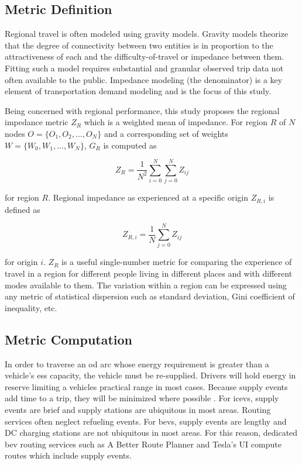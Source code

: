 \subsection*{Metric Definition}

Regional travel is often modeled using gravity models. Gravity models theorize that the degree of connectivity between two entities is in proportion to the attractiveness of each and the difficulty-of-travel or impedance between them. Fitting such a model requires substantial and granular observed trip data not often available to the public. Impedance modeling (the denominator) is a key element of transportation demand modeling and is the focus of this study.

Being concerned with regional performance, this study proposes the regional impedance metric $Z_R$ which is a weighted mean of impedance. For region $R$ of $N$ nodes $O = \{O_1, O_2, \dots, O_N\}$ and a corresponding set of weights $W = \{W_0, W_1, \dots, W_N\}$, $G_R$ is computed as

\begin{equation}
	Z_{R} = \frac{1}{N^2}\sum_{i = 0}^{N} \sum_{j = 0 }^{N} Z_{ij} \label{eq:regional_impedance}
\end{equation}

for region $R$. Regional impedance as experienced at a specific origin $Z_{R,i}$ is defined as

\begin{equation}
	Z_{R,i} = \frac{1}{N}\sum_{j = 0 }^{N} Z_{ij} \label{eq:specific_regional_impedance}
\end{equation}

for origin $i$. $Z_R$ is a useful single-number metric for comparing the experience of travel in a region for different people living in different places and with different modes available to them. The variation within a region can be expressed using any metric of statistical dispersion such as standard deviation, Gini coefficient of inequality, etc.

\subsection*{Metric Computation}

In order to traverse an \gls{od} arc whose energy requirement is greater than a vehicle's \gls{ess} capacity, the vehicle must be re-supplied. Drivers will hold energy in reserve limiting a vehicles practical range in most cases. Because supply events add time to a trip, they will be minimized where possible \cite{Ge_2022}. For \glspl{icev}, supply events are brief and supply stations are ubiquitous in most areas. Routing services often neglect refueling events. For \glspl{bev}, supply events are lengthy and DC charging stations are not ubiquitous in most areas.  For this reason, dedicated \gls{bev} routing services such as A Better Route Planner and Tesla's UI compute routes which include supply events.


